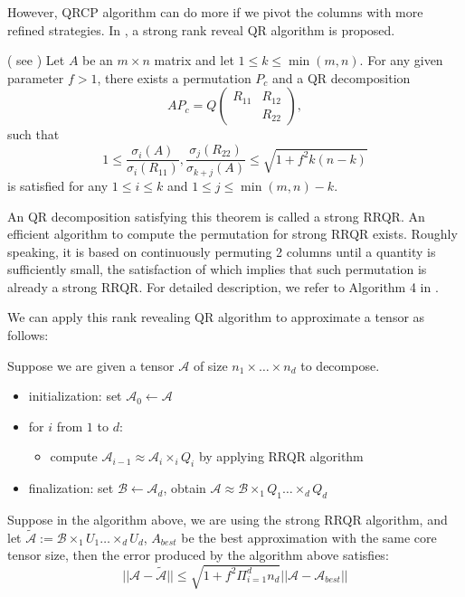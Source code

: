 \documentclass[12pt]{article}
\begin{document}
However, QRCP algorithm can do more if we pivot the columns with more refined strategies. In \cite{qrcp}, a strong rank reveal QR algorithm is proposed. 

\begin{mythm} ( see \cite{qrcp} )
\label{strongqrcpthm}
Let $A$ be an $m \times n$ matrix and let $ 1 \leq k \leq \min(m, n)$. For any given parameter $f > 1$, there exists a permutation $P_c$ and a QR decomposition
$$
A P_c = Q
\begin{pmatrix}
R_{11} & R_{12}  \\
           & R_{22}
\end{pmatrix},
$$
such that 
$$ 1 \leq \frac{\sigma_i(A)}{\sigma_i(R_{11})} , \frac{\sigma_j(R_{22})}{\sigma_{k+j}(A)} \leq \sqrt{ 1 + f^2 k (n - k)}$$
is satisfied for any $1 \leq i \leq k$ and $1 \leq j \leq \min(m, n) - k$.
\end{mythm}

An QR decomposition satisfying this theorem is called a strong RRQR. An efficient algorithm to compute the permutation for strong RRQR exists. Roughly speaking, it is based on continuously permuting 2 columns until a quantity is sufficiently small, the satisfaction of which implies that such permutation is already a strong RRQR. For detailed description, we refer to Algorithm 4 in \cite{qrcp}.

We can apply this rank revealing QR algorithm to approximate a tensor as follows:
\begin{myalgo}
Suppose we are given a tensor $\mathcal{A}$ of size $n_1 \times \dots \times n_d$ to decompose. 
\begin{itemize}
\item initialization: set $\mathcal{A}_0 \leftarrow \mathcal{A}$
\item for $i$ from $1$ to $d$: 
	\begin{itemize}
		\item compute $\mathcal{A}_{i-1} \approx \mathcal{A}_i \times_i Q_i $ by applying RRQR algorithm
	\end{itemize}
\item finalization: set $\mathcal{B} \leftarrow \mathcal{A}_d$, obtain $\mathcal{A} \approx  \mathcal{B} \times_1 Q_1 \dots \times_d Q_d $
\end{itemize}
\end{myalgo}

\begin{mythm}
Suppose in the algorithm above, we are using the strong RRQR algorithm, and let $\tilde{\mathcal{A}} :=  \mathcal{B} \times_1 U_1 \dots \times_d U_d $, $A_{best}$ be the best approximation with the same core tensor size, then the error produced by the algorithm above satisfies:
$$ || \mathcal{A} - \tilde{\mathcal{A}} || \leq \sqrt{1 + f^2 \Pi_{i = 1}^d n_d} || \mathcal{A} - \mathcal{A}_{best} || $$
\end{mythm}
\end{document}
